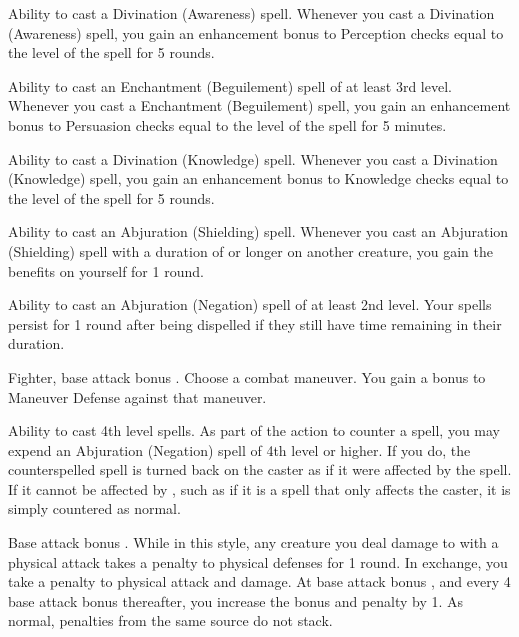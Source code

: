 \featpre Ability to cast a Divination (Awareness) spell.
\featben Whenever you cast a Divination (Awareness) spell, you gain an enhancement bonus to Perception checks equal to the level of the spell for 5 rounds.

\featpre Ability to cast an Enchantment (Beguilement) spell of at least 3rd level.
\featben Whenever you cast a Enchantment (Beguilement) spell, you gain an enhancement bonus to Persuasion checks equal to the level of the spell for 5 minutes.

\featpre Ability to cast a Divination (Knowledge) spell.
\featben Whenever you cast a Divination (Knowledge) spell, you gain an enhancement bonus to Knowledge checks equal to the level of the spell for 5 rounds.

\featpre Ability to cast an Abjuration (Shielding) spell.
\featben Whenever you cast an Abjuration (Shielding) spell with a duration of \durshort or longer on another creature, you gain the benefits on yourself for 1 round.

\featpre Ability to cast an Abjuration (Negation) spell of at least 2nd level.
\featben Your spells persist for 1 round after being dispelled if they still have time remaining in their duration.

\featpre Fighter, base attack bonus .
\featben Choose a combat maneuver. You gain a  bonus to Maneuver Defense against that maneuver.

 Ability to cast 4th level spells.
 As part of the action to counter a spell, you may expend an Abjuration (Negation) spell of 4th level or higher. If you do, the counterspelled spell is turned back on the caster as if it were affected by the  spell. If it cannot be affected by , such as if it is a spell that only affects the caster, it is simply countered as normal.

\featpre Base attack bonus .
 While in this style, any creature you deal damage to with a physical attack takes a  penalty to physical defenses for 1 round. In exchange, you take a  penalty to physical attack and damage. At base attack bonus , and every 4 base attack bonus thereafter, you increase the bonus and penalty by 1. As normal, penalties from the same source do not stack.

